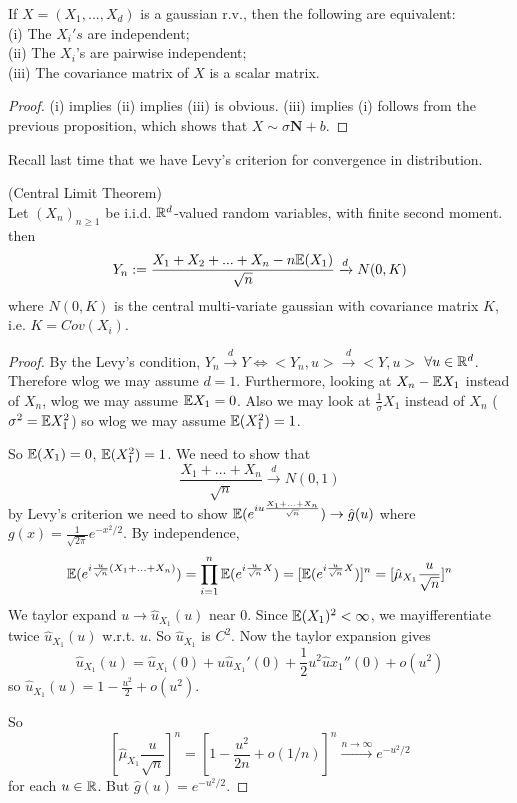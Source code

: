\documentclass[a4paper]{article}
\begin{document}
\begin{prop}
If $X = (X_1,...,X_d)$ is a gaussian r.v., then the following are equivalent:\\
(i) The $X_i's$ are independent;\\
(ii) The $X_i$'s are pairwise independent;\\
(iii) The covariance matrix of $X$ is a scalar matrix.
\begin{proof}
(i) implies (ii) implies (iii) is obvious. (iii) implies (i) follows from the previous proposition, which shows that $X \sim \sigma \mathbf{N} + b$.
\end{proof}
\end{prop}

Recall last time that we have Levy's criterion for convergence in distribution.

\begin{thm} (Central Limit Theorem)\\
Let $(X_n)_{n \geq 1}$ be i.i.d. $\mathbb{R}^d$-valued random variables, with finite second moment. then $$Y_n := \frac{X_1+X_2+...+X_n - n\mathbb{E}(X_1)}{\sqrt{n}} \xrightarrow{d} N(0,K)$$ where $N(0,K)$ is the central multi-variate gaussian with covariance matrix $K$, i.e. $K = Cov(X_i)$.
\begin{proof}
By the Levy's condition, $Y_n \xrightarrow{d} Y \iff <Y_n,u> \xrightarrow{d} <Y,u>$ $\forall u \in \mathbb{R}^d$. Therefore wlog we may assume $d=1$. Furthermore, looking at $X_n - \mathbb{E} X_1$ instead of $X_n$, wlog we may assume $\mathbb{E} X_1 = 0$. Also we may look at $\frac{1}{\sigma} X_1$ instead of $X_n$ ($\sigma^2 = \mathbb{E} X_1^2$) so wlog we may assume $\mathbb{E} (X_1^2) = 1$.

So $\mathbb{E}(X_1) = 0$, $\mathbb{E}(X_1^2) = 1$. We need to show that $$\frac{X_1+...+X_n}{\sqrt{n}} \xrightarrow{d} N(0,1)$$ by Levy's criterion we need to show $\mathbb{E}(e^{iu\frac{X_1+...+X_n}{\sqrt{n}}} ) \to \hat{g}(u)$ where $g(x) = \frac{1}{\sqrt{2\pi}} e^{-x^2/2}$. By independence,
\begin{equation*}
\begin{aligned}
\mathbb{E}(e^{i\frac{u}{\sqrt{n}} (X_1+...+X_n)}) = \prod_{i=1}^n \mathbb{E}(e^{i \frac{u}{\sqrt{n}}X}) = [\mathbb{E}(e^{i \frac{u}{\sqrt{n}}X})]^n = [\hat{\mu}_{X_1} \frac{u}{\sqrt{n}}]^n
\end{aligned}
\end{equation*}
We taylor expand $u \to \hat{u}_{X_1}(u)$ near 0. Since $\mathbb{E}(X_1)^2 < \infty$, we mayifferentiate twice $\hat{u}_{X_1}(u)$ w.r.t. $u$. So $\hat{u}_{X_1}$ is $C^2$. Now the taylor expansion gives $$\hat{u}_{X_1}(u) = \hat{u}_{X_1} (0) + u \hat{u}_{X_1}' (0) + \frac{1}{2} u^2 \hat{u} x_1''(0) + o(u^2)$$ so $\hat{u}_{X_1}(u) = 1-\frac{u^2}{2} + o(u^2)$.

So $$[\hat{\mu}_{X_1} \frac{u}{\sqrt{n}}]^n = [1-\frac{u^2}{2n} + o(1/n)]^n \xrightarrow{n \to \infty} e^{-u^2/2}$$for each $u \in \mathbb{R}$. But $\hat{g}(u) = e^{-u^2/2}$.
\end{proof}
\end{thm}
\end{document}
